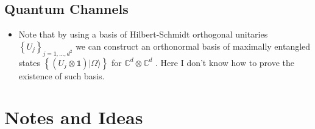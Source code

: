 \subsection{Quantum Channels}
\begin{itemize}
	\item Note that by using a basis of Hilbert-Schmidt orthogonal unitaries $\left\{U_{j}\right\}_{j=1, \ldots, d^{2}}$ we can construct an orthonormal basis of maximally entangled states $\left\{\left(U_{j} \otimes \mathbb{1}\right)|\Omega\rangle\right\}$ for $\mathbb{C}^{d} \otimes \mathbb{C}^{d}$ . Here I don't know how to prove the existence of such basis.
\end{itemize}
\section{Notes and Ideas}
